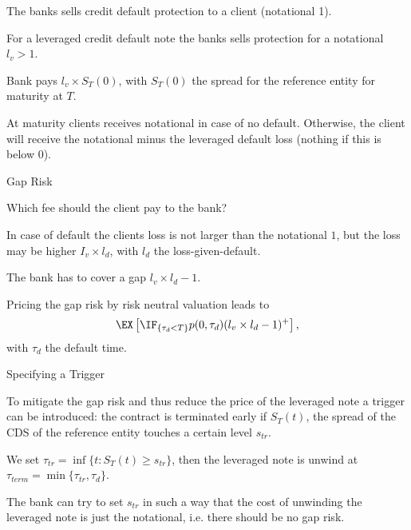 


	The banks sells credit default protection to a client (notational 1).

	For a leveraged credit default note the banks sells protection for a notational $l_v>1$.

	Bank pays $l_v \times S_T(0)$, with $S_T(0)$ the spread for the reference entity for maturity at $T$.

	At maturity clients receives notational in case of no default. Otherwise, the client will receive the notational minus the leveraged default loss (nothing if this is below 0).






{Gap Risk}






	Which fee should the client pay to the bank?

	In case of default the clients loss is not larger than the notational $1$, but the loss may be higher $I_v \times l_d$, with $l_d$ the loss-given-default.

	The bank has to cover a gap $l_v \times l_d -1$.

	Pricing the gap risk by risk neutral valuation leads to
$$
\EX\left[\IF_{\{\tau_d < T\}} p(0,\tau_d)(l_v \times l_d -1)^+\right],
$$
with $\tau_d$ the default time.






{Specifying a Trigger}






	To mitigate the gap risk and thus reduce the price of the leveraged note a trigger can be introduced: the contract is terminated early if $S_T(t)$, the spread of the CDS of the reference entity touches a certain level  $s_{tr}$.

	We set $\tau_{tr}= \inf\{t: S_T(t) \geq s_{tr}\}$, then the leveraged note is unwind at $\tau_{term}= \min\{\tau_{tr}, \tau_{d} \}$.

	The bank can try to set $s_{tr}$ in such a way that the cost of unwinding the leveraged note is just the notational, i.e. there should be no gap risk.




